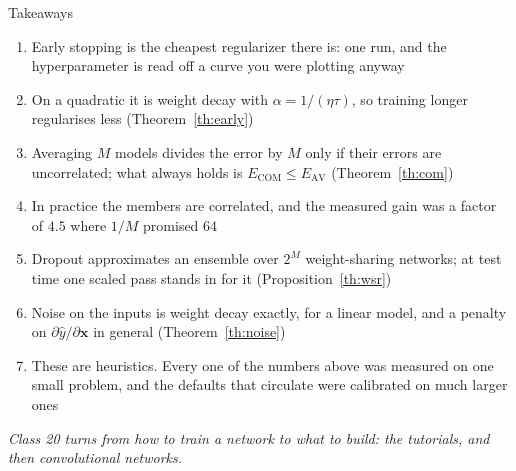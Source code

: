 \documentclass[aspectratio=169, 11pt]{beamer}
\newcommand{\bridge}[1]{%
  {\scriptsize\itshape\color{mcMuted} #1\par}\vspace{0.35em}}
\newcommand{\nosrc}{}       %
\begin{document}
\begin{frame}{Takeaways}
  \nosrc
  \vspace{-0.15em}
  {\scriptsize
  \begin{enumerate}\itemsep0.24em
    \item Early stopping is the cheapest regularizer there is: one run,
          and the hyperparameter is read off a curve you were plotting
          anyway
    \item On a quadratic it is weight decay with
          $\alpha = 1/(\eta\tau)$, so training longer regularises less
          (Theorem~\ref{th:early})
    \item Averaging $M$ models divides the error by $M$ only if their
          errors are uncorrelated; what always holds is
          $E_{\mathrm{COM}} \leq E_{\mathrm{AV}}$ (Theorem~\ref{th:com})
    \item In practice the members are correlated, and the measured gain
          was a factor of $4.5$ where $1/M$ promised $64$
    \item Dropout approximates an ensemble over $2^M$ weight-sharing
          networks; at test time one scaled pass stands in for it
          (Proposition~\ref{th:wsr})
    \item Noise on the inputs is weight decay exactly, for a linear
          model, and a penalty on $\partial\hat y/\partial\mathbf{x}$ in
          general (Theorem~\ref{th:noise})
    \item These are heuristics. Every one of the numbers above was
          measured on one small problem, and the defaults that circulate
          were calibrated on much larger ones
  \end{enumerate}}
  \bridge{Class 20 turns from how to train a network to what to build:
  the tutorials, and then convolutional networks.}
\end{frame}
\end{document}
